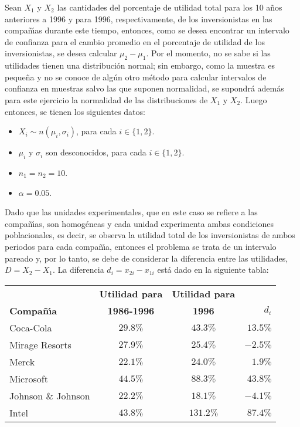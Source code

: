 \begin{solucion}
 Sean $X_1$ y $X_2$ las cantidades del porcentaje de utilidad total para los 10 a\~nos anteriores a 1996 y para 1996, respectivamente, de los inversionistas en las compa\~n\'{\i}as durante este tiempo, entonces, como se desea encontrar un intervalo de confianza para el cambio promedio en el porcentaje de utilidad de los inversionistas, se desea calcular $\mu_2 - \mu_1$. Por el momento, no se sabe si las utilidades tienen una distribuci\'on normal; sin embargo, como la muestra es peque\~na y no se conoce de alg\'un otro m\'etodo para calcular intervalos de confianza en muestras salvo las que suponen normalidad, se supondr\'a adem\'as para este ejercicio la normalidad de las distribuciones de $X_1$ y $X_2$. Luego entonces, se tienen los siguientes datos:
 \begin{itemize}
  \item $X_i \sim n \left( \mu_i , \sigma_i \right)$, para cada $i \in \{ 1, 2 \}$.
  \item $\mu_i$ y $\sigma_i$ son desconocidos, para cada $i \in \{ 1, 2 \}$.
  \item $n_1 = n_2 = 10$.
  \item $\alpha = 0.05$.
 \end{itemize}
 Dado que las unidades experimentales, que en este caso se refiere a las compa\~n\'{\i}as, son homog\'eneas y cada unidad experimenta ambas condiciones poblacionales, es decir, se observa la utilidad total de los inversionistas de ambos periodos para cada compa\~n\'{\i}a, entonces el problema se trata de un intervalo pareado y, por lo tanto, se debe de considerar la diferencia entre las utilidades, $D = X_2 - X_1$. La diferencia $d_i = x_{2i} - x_{1i}$ est\'a dado en la siguiente tabla:
 \begin{center}
  \begin{tabular}{lccr}
   & \textbf{Utilidad para} & \textbf{Utilidad para} \\
   \textbf{Compa\~n\'{\i}a} & \textbf{1986-1996} & \textbf{1996} & $d_i$ \\
   \hline 
   Coca-Cola & $29.8\%$ & $43.3\%$ & $13.5\%$ \\
   Mirage Resorts & $27.9\%$ & $25.4\%$ & $-2.5\%$ \\
   Merck & $22.1\%$ & $24.0\%$ & $1.9\%$ \\
   Microsoft & $44.5\%$ & $88.3\%$ & $43.8\%$ \\
   Johnson \& Johnson & $22.2\%$ & $18.1\%$ & $-4.1\%$ \\
   Intel & $43.8\%$ & $131.2\%$ & $87.4\%$ \\

\end{tabular}
\end{center}
\end{solucion}
